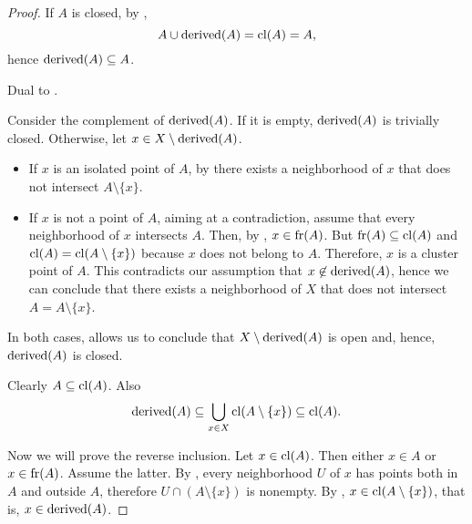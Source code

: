 \begin{proof}
  If \( A \) is closed, by ,
  \begin{equation*}
    A \cup \operatorname{derived}(A) = \operatorname{cl}(A) = A,
  \end{equation*}
  hence \( \operatorname{derived}(A) \subseteq A \).

   Dual to .

   Consider the complement of \( \operatorname{derived}(A) \). If it is empty, \( \operatorname{derived}(A) \) is trivially closed. Otherwise, let \( x \in X \setminus \operatorname{derived}(A) \).

  \begin{itemize}
    \item If \( x \) is an isolated point of \( A \), by  there exists a neighborhood of \( x \) that does not intersect \( A \setminus \{ x \} \).
    \item If \( x \) is not a point of \( A \), aiming at a contradiction, assume that every neighborhood of \( x \) intersects \( A \). Then, by , \( x \in \operatorname{fr}(A) \). But \( \operatorname{fr}(A) \subseteq \operatorname{cl}(A) \) and \( \operatorname{cl}(A) = \operatorname{cl}(A \setminus \{ x \}) \) because \( x \) does not belong to \( A \). Therefore, \( x \) is a cluster point of \( A \). This contradicts our assumption that \( x \not\in \operatorname{derived}(A) \), hence we can conclude that there exists a neighborhood of \( X \) that does not intersect \( A = A \setminus \{ x \} \).
  \end{itemize}

  In both cases,  allows us to conclude that \( X \setminus \operatorname{derived}(A) \) is open and, hence, \( \operatorname{derived}(A) \) is closed.

   Clearly \( A \subseteq \operatorname{cl}(A) \). Also
  \begin{equation*}
    \operatorname{derived}(A) \subseteq \bigcup_{x \in X} \operatorname{cl}(A \setminus \{ x \}) \subseteq \operatorname{cl}(A).
  \end{equation*}

  Now we will prove the reverse inclusion. Let \( x \in \operatorname{cl}(A) \). Then either \( x \in A \) or \( x \in \operatorname{fr}(A) \). Assume the latter. By , every neighborhood \( U \) of \( x \) has points both in \( A \) and outside \( A \), therefore \( U \cap (A \setminus \{ x \}) \) is nonempty. By , \( x \in \operatorname{cl}(A \setminus \{ x \}) \), that is, \( x \in \operatorname{derived}(A) \).


\end{proof}

